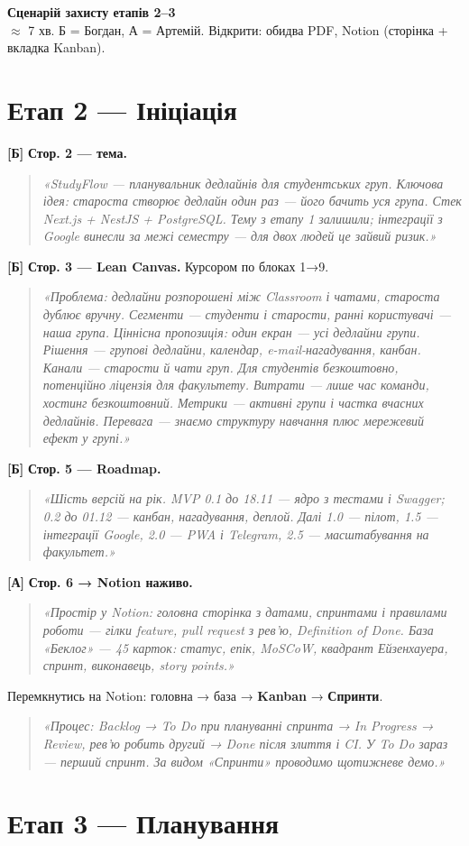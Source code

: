 \documentclass[11pt]{article}
\newcommand{\say}[1]{\begin{quote}\itshape «#1»\end{quote}}
\newcommand{\who}[1]{\textcolor{accent}{\textbf{[#1]}}}
\begin{document}
\begin{center}
{\LARGE\bfseries Сценарій захисту етапів 2–3}\\[3pt]
{\small $\approx$ 7 хв. Б = Богдан, А = Артемій. Відкрити: обидва PDF, Notion (сторінка + вкладка Kanban).}
\end{center}

\section*{Етап 2 — Ініціація}

\who{Б} \textbf{Стор. 2 — тема.}
\say{StudyFlow — планувальник дедлайнів для студентських груп. Ключова ідея: староста створює дедлайн один раз — його бачить уся група. Стек Next.js + NestJS + PostgreSQL. Тему з етапу 1 залишили; інтеграції з Google винесли за межі семестру — для двох людей це зайвий ризик.}

\who{Б} \textbf{Стор. 3 — Lean Canvas.} Курсором по блоках 1→9.
\say{Проблема: дедлайни розпорошені між Classroom і чатами, староста дублює вручну. Сегменти — студенти і старости, ранні користувачі — наша група. Ціннісна пропозиція: один екран — усі дедлайни групи. Рішення — групові дедлайни, календар, e-mail-нагадування, канбан. Канали — старости й чати груп. Для студентів безкоштовно, потенційно ліцензія для факультету. Витрати — лише час команди, хостинг безкоштовний. Метрики — активні групи і частка вчасних дедлайнів. Перевага — знаємо структуру навчання плюс мережевий ефект у групі.}

\who{Б} \textbf{Стор. 5 — Roadmap.}
\say{Шість версій на рік. MVP 0.1 до 18.11 — ядро з тестами і Swagger; 0.2 до 01.12 — канбан, нагадування, деплой. Далі 1.0 — пілот, 1.5 — інтеграції Google, 2.0 — PWA і Telegram, 2.5 — масштабування на факультет.}

\who{А} \textbf{Стор. 6 → Notion наживо.}
\say{Простір у Notion: головна сторінка з датами, спринтами і правилами роботи — гілки feature, pull request з рев'ю, Definition of Done. База «Беклог» — 45 карток: статус, епік, MoSCoW, квадрант Ейзенхауера, спринт, виконавець, story points.}
Перемкнутись на Notion: головна → база → \textbf{Kanban} → \textbf{Спринти}.
\say{Процес: Backlog → To Do при плануванні спринта → In Progress → Review, рев'ю робить другий → Done після злиття і CI. У To Do зараз — перший спринт. За видом «Спринти» проводимо щотижневе демо.}

\section*{Етап 3 — Планування}
\end{document}
